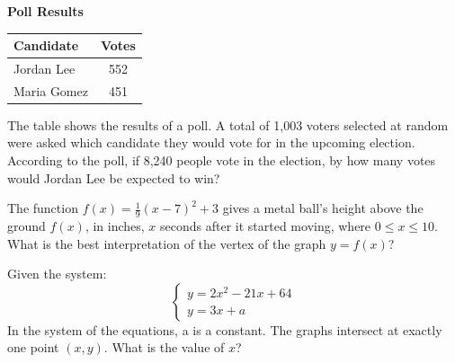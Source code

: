 \begin{center}
\textbf{Poll Results}

\vspace{0.4em}
\begin{tabular}{|l|c|}
\hline
Candidate & Votes \\
\hline
Jordan Lee & 552 \\
Maria Gomez & 451 \\
\hline
\end{tabular}
\end{center}

\vspace{1em}

The table shows the results of a poll. A total of 1,003 voters selected at random were asked which candidate they would vote for in the upcoming election.  
According to the poll, if 8,240 people vote in the election, by how many votes would Jordan Lee be expected to win?

\vspace{0.75em}


\vspace{2em}

\noindent\markforreview
\vspace{1em}

The function $f(x) = \frac{1}{9}(x - 7)^2 + 3$ gives a metal ball's height above the ground $f(x)$, in inches, $x$ seconds after it started moving, where $0 \leq x \leq 10$.  
What is the best interpretation of the vertex of the graph $y = f(x)$?

\vspace{0.75em}


\vspace{2em}
\noindent\markforreview
\vspace{1em}

Given the system:  
\[
\begin{cases}
y = 2x^2 - 21x + 64 \\
y = 3x + a
\end{cases}
\]  
In the system of the equations, a is a constant. The graphs intersect at exactly one point \((x, y)\). What is the value of \(x\)?

